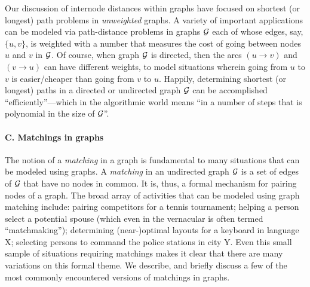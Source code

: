 
\bigskip

Our discussion of internode distances within graphs have focused on
shortest (or longest) path problems in {\em unweighted} graphs.  A
variety of important applications can be modeled via path-distance
problems in graphs $\mbox{$\cal G$}$ each of whose edges, say, $\{u,v\}$, is
weighted with a number that measures the cost of going between nodes
$u$ and $v$ in $\mbox{$\cal G$}$.  Of course, when graph $\mbox{$\cal G$}$ is directed, then the
arcs $(u \rightarrow v)$ and $(v \rightarrow u)$ can have different
weights, to model situations wherein going from $u$ to $v$ is
easier/cheaper than going from $v$ to $u$.  Happily, determining
shortest (or longest) paths in a directed or undirected graph $\mbox{$\cal G$}$ can
be accomplished ``efficiently''---which in the algorithmic world means
``in a number of steps that is polynomial in the size of $\mbox{$\cal G$}$''.
 


\paragraph{\small\sf C. Matchings in graphs}

The notion of a {\it matching} in a graph is fundamental to many
situations that can be modeled using graphs.  A {\it matching} in an
undirected graph $\mbox{$\cal G$}$ is a set of edges of $\mbox{$\cal G$}$ that have no nodes in
common.  It is, thus, a formal mechanism for pairing nodes of a graph.
The broad array of activities that can be modeled using graph matching
include: pairing competitors for a tennis tournament; helping a person
select a potential spouse (which even in the vernacular is often
termed ``matchmaking''); determining (near-)optimal layouts for a
keyboard in language X; selecting persons to command the police
stations in city Y.  Even this small sample of situations requiring
matchings makes it clear that there are many variations on this formal
theme.  We describe, and briefly discuss a few of the most commonly
encountered versions of matchings in graphs.

